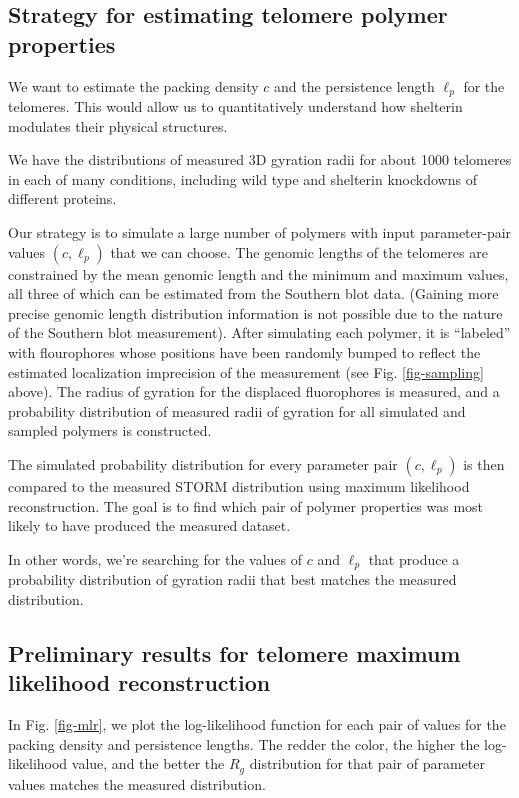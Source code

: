 \documentclass[11pt]{article}
\begin{document}
\subsection{Strategy for estimating telomere polymer properties}
\label{sec-3-2}
We want to estimate the packing density $c$ and the persistence length
$\ell_p$ for the telomeres. This would allow us to quantitatively
understand how shelterin modulates their physical structures.

We have the distributions of measured 3D gyration radii for about 1000
telomeres in each of many conditions, including wild type and
shelterin knockdowns of different proteins.

Our strategy is to simulate a large number of polymers with input
parameter-pair values $\left(c, \ell_p \right)$ that we can
choose. The genomic lengths of the telomeres are constrained by the
mean genomic length and the minimum and maximum values, all three of
which can be estimated from the Southern blot data. (Gaining more
precise genomic length distribution information is not possible due to
the nature of the Southern blot measurement). After simulating each
polymer, it is ``labeled'' with flourophores whose positions have been
randomly bumped to reflect the estimated localization imprecision of
the measurement (see Fig. \ref{fig-sampling} above). The radius of
gyration for the displaced fluorophores is measured, and a probability
distribution of measured radii of gyration for all simulated and
sampled polymers is constructed.

The simulated probability distribution for every parameter pair
$\left(c, \ell_p \right)$ is then compared to the measured STORM
distribution using maximum likelihood reconstruction. The goal is to
find which pair of polymer properties was most likely to have produced
the measured dataset.

In other words, we're searching for the values of $c$ and $\ell_p$
that produce a probability distribution of gyration radii that best
matches the measured distribution.

\subsection{Preliminary results for telomere maximum likelihood reconstruction}
\label{sec-3-3}
In Fig. \ref{fig-mlr}, we plot the log-likelihood function for each
pair of values for the packing density and persistence lengths. The
redder the color, the higher the log-likelihood value, and the better
the $R_g$ distribution for that pair of parameter values matches the
measured distribution.
\end{document}
